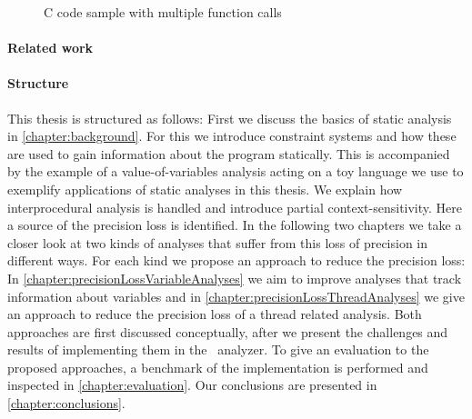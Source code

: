   \begin{figure}
    \centering
    \begin{subfigure}{0.35\textwidth}
      \centering
      
    \end{subfigure}
    \caption{C code sample with multiple function calls}
    \label{fig:exampleIntro}
  \end{figure}


\paragraph{Related work}

\paragraph{Structure} 
This thesis is structured as follows: First we discuss the basics of static analysis in \autoref{chapter:background}. For this we introduce constraint systems and how these are used to gain information about the program statically. This is accompanied by the example of a value-of-variables analysis acting on a toy language we use to exemplify applications of static analyses in this thesis. We explain how interprocedural analysis is handled and introduce partial context-sensitivity. Here a source of the precision loss is identified. In the following two chapters we take a closer look at two kinds of analyses that suffer from this loss of precision in different ways. For each kind we propose an approach to reduce the precision loss: In \autoref{chapter:precisionLossVariableAnalyses} we aim to improve analyses that track information about variables and in \autoref{chapter:precisionLossThreadAnalyses} we give an approach to reduce the precision loss of a thread related analysis. Both approaches are first discussed conceptually, after we present the challenges and results of implementing them in the \gob\ analyzer. To give an evaluation to the proposed approaches, a benchmark of the implementation is performed and inspected in \autoref{chapter:evaluation}. Our conclusions are presented in \autoref{chapter:conclusions}.
